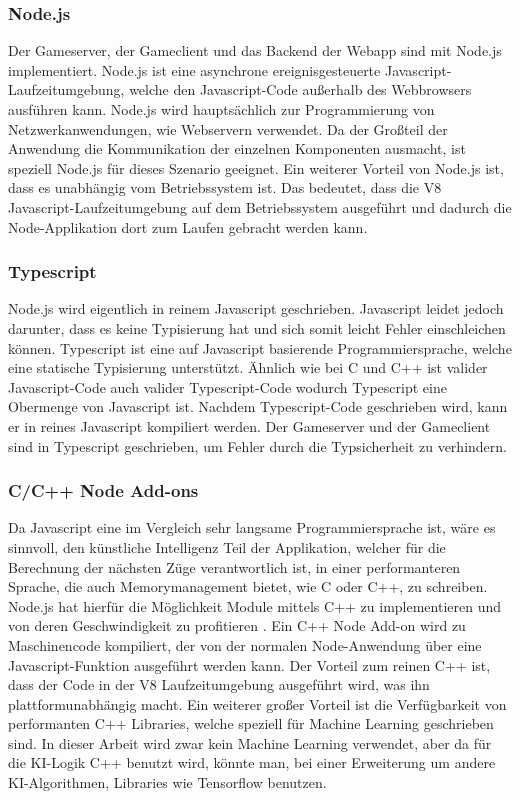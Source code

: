 \documentclass[12pt,a4paper,bibliography=totocnumbered,listof=totocnumbered]{article}
\begin{document}
\subsubsection{Node.js}
Der Gameserver, der Gameclient und das Backend der Webapp sind mit Node.js implementiert. 
Node.js ist eine asynchrone ereignisgesteuerte Javascript-Laufzeitumgebung, welche den Javascript-Code außerhalb des Webbrowsers ausführen kann.
Node.js wird hauptsächlich zur Programmierung von Netzwerkanwendungen, wie Webservern verwendet. Da der Großteil der Anwendung die
Kommunikation der einzelnen Komponenten ausmacht, ist speziell Node.js für dieses Szenario geeignet. 
Ein weiterer Vorteil von Node.js ist, dass es unabhängig vom Betriebssystem ist. Das bedeutet, dass die V8 Javascript-Laufzeitumgebung
auf dem Betriebssystem ausgeführt und dadurch die Node-Applikation dort zum Laufen gebracht werden kann.
\cite{Node}

\subsubsection{Typescript}
Node.js wird eigentlich in reinem Javascript geschrieben. Javascript leidet jedoch darunter, dass es keine Typisierung hat und sich somit leicht Fehler 
einschleichen können. Typescript ist eine auf Javascript basierende Programmiersprache, welche eine statische Typisierung unterstützt. 
Ähnlich wie bei C und C++ ist valider Javascript-Code auch valider Typescript-Code wodurch Typescript eine Obermenge von Javascript ist.
Nachdem Typescript-Code geschrieben wird, kann er in reines Javascript kompiliert werden.
Der Gameserver und der Gameclient sind in Typescript geschrieben, um Fehler durch die Typsicherheit zu verhindern. 

\subsubsection{C/C++ Node Add-ons}
Da Javascript eine im Vergleich sehr langsame Programmiersprache ist, wäre es sinnvoll, den künstliche Intelligenz Teil der Applikation, welcher für die 
Berechnung der nächsten Züge verantwortlich ist, in einer performanteren Sprache, die auch Memorymanagement bietet, wie C oder C++, zu schreiben. 
Node.js hat hierfür die Möglichkeit
Module mittels C++ zu implementieren und von deren Geschwindigkeit zu profitieren \cite{NodeC++Performance}. Ein C++ Node Add-on wird zu Maschinencode kompiliert, der von der
normalen Node-Anwendung über eine Javascript-Funktion ausgeführt werden kann. Der Vorteil zum reinen C++ ist, dass der Code in der V8 
Laufzeitumgebung ausgeführt wird, was ihn plattformunabhängig macht. \cite{C++Node}
Ein weiterer großer Vorteil ist die Verfügbarkeit von performanten C++ Libraries, welche speziell für Machine Learning geschrieben sind. 
In dieser Arbeit wird zwar kein Machine Learning verwendet, aber da für die \ac{KI}-Logik C++ benutzt wird, könnte man, bei einer Erweiterung 
um andere \ac{KI}-Algorithmen, Libraries wie Tensorflow benutzen.
\end{document}
